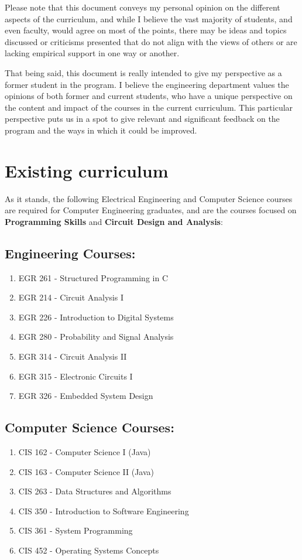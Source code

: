 \documentclass[12pt]{article}
\numberwithin{figure}{section}
\numberwithin{equation}{section}
\begin{document}
{Please note that this document conveys my personal opinion on the
different aspects of the curriculum, and while I believe the vast
majority of students, and even faculty, would agree on most of the
points, there may be ideas and topics discussed or criticisms presented
that do not align with the views of others or are lacking empirical
support in one way or another.

\bigskip

That being said, this document is really intended to give my perspective
as a former student in the program. I believe the engineering department
values the opinions of both former and current students, who have a
unique perspective on the content and impact of the courses in the
current curriculum. This particular perspective puts us in a spot to
give relevant and significant feedback on the program and the ways in
which it could be improved.

\newpage
\section{Existing curriculum}\label{existing-curriculum}
As it stands, the following Electrical Engineering and Computer Science
courses are required for Computer Engineering graduates, and are the
courses focused on \textbf{Programming Skills} and \textbf{Circuit
Design and Analysis}:

\subsection{Engineering Courses:}\label{engineering-courses}
\begin{enumerate}
\itemsep1pt\parskip0pt
\item EGR 261 - Structured Programming in C
\item EGR 214 - Circuit Analysis I
\item EGR 226 - Introduction to Digital Systems
\item EGR 280 - Probability and Signal Analysis
\item EGR 314 - Circuit Analysis II
\item EGR 315 - Electronic Circuits I
\item EGR 326 - Embedded System Design
\end{enumerate}

\subsection{Computer Science Courses:}\label{computer-science-courses}
\begin{enumerate}
\itemsep1pt\parskip0pt
\item CIS 162 - Computer Science I (Java)
\item CIS 163 - Computer Science II (Java)
\item CIS 263 - Data Structures and Algorithms
\item CIS 350 - Introduction to Software Engineering
\item CIS 361 - System Programming
\item CIS 452 - Operating Systems Concepts
\end{enumerate}

}
\end{document}
